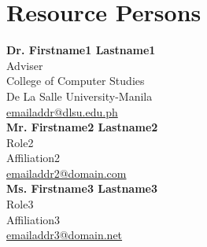 %
%
%                 

\chapter{Resource Persons}
\label{sec:appendixd}

%
%
%
%

%
%
\newcommand{\resperson}[4]{\textbf{#1} \\ #2 \\ #3 \\ \url{#4}\vspace{0.5em}\\}

\resperson{Dr. Firstname1 Lastname1}{Adviser}{College of Computer Studies\\De La Salle University-Manila}{emailaddr@dlsu.edu.ph}
\resperson{Mr. Firstname2 Lastname2}{Role2}{Affiliation2}{emailaddr2@domain.com}
\resperson{Ms. Firstname3 Lastname3}{Role3}{Affiliation3}{emailaddr3@domain.net}

